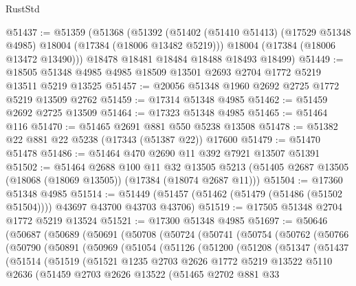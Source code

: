\begin{lexlean}{RustStd}
\begin{coremodule}
@51437 := @51359
    (@51368
      (@51392
        (@51402 (@51410 @51413) (@17529 @51348 @4985) @18004 (@17384 (@18006 @13482 @5219)))
        @18004
        (@17384 (@18006 @13472 @13490)))
      @18478
      @18481
      @18484
      @18488
      @18493
      @18499)
@51449 := @18505 @51348 @4985 @4985 @18509 @13501 @2693 @2704 @1772 @5219 @13511 @5219 @13525
@51457 := @20056 @51348 @1960 @2692 @2725 @1772 @5219 @13509 @2762
@51459 := @17314 @51348 @4985
@51462 := @51459 @2692 @2725 @13509
@51464 := @17323 @51348 @4985
@51465 := @51464 @116
@51470 := @51465 @2691 @881 @550 @5238 @13508
@51478 := @51382 @22 @881 @22 @5238 (@17343 (@51387 @22)) @17600
@51479 := @51470 @51478
@51486 := @51464 @470 @2690 @11 @392 @7921 @13507 @51391
@51502 := @51464
    @2688
    @100
    @11
    @32
    @13505
    @5213
    (@51405 @2687 @13505 (@18068 (@18069 @13505)) (@17384 (@18074 @2687 @11)))
@51504 := @17360 @51348 @4985
@51514 := @51449 (@51457 (@51462 (@51479 (@51486 (@51502 @51504)))) @43697 @43700 @43703 @43706)
@51519 := @17505 @51348 @2704 @1772 @5219 @13524
@51521 := @17300 @51348 @4985
@51697 := @50646
    (@50687
      (@50689
        (@50691
          (@50708
            (@50724
              (@50741
                (@50754
                  (@50762
                    (@50766
                      (@50790
                        (@50891
                          (@50969
                            (@51054
                              (@51126
                                (@51200
                                  (@51208
                                    (@51347
                                      (@51437
                                        (@51514
                                          (@51519
                                            (@51521
                                              @1235
                                              @2703
                                              @2626
                                              @1772
                                              @5219
                                              @13522
                                              @5110
                                              @2636
                                              (@51459
                                                @2703
                                                @2626
                                                @13522
                                                (@51465
                                                  @2702
                                                  @881
                                                  @33

\end{coremodule}
\end{lexlean}
